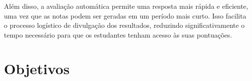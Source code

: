 Além disso, a avaliação automática permite uma resposta mais rápida e eficiente, uma vez que as notas podem ser geradas em um período mais curto. Isso facilita o processo logístico de divulgação dos resultados, reduzindo significativamente o tempo necessário para que os estudantes tenham acesso às suas pontuações.

\section{Objetivos}

%
